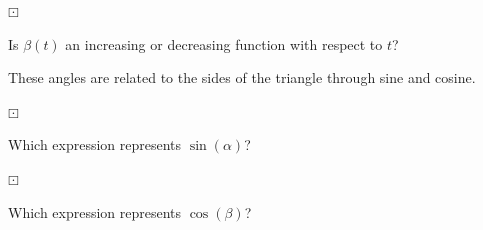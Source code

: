 \documentclass{ximera}
\begin{document}
\begin{question} $\boxdot$ 

Is $\beta(t)$ an increasing or decreasing function with respect to $t$?

\begin{multipleChoice}
\end{multipleChoice}

\end{question}







These angles are related to the sides of the triangle through sine and cosine.










\begin{question} $\boxdot$ 

Which expression represents $\sin(\alpha)$?

\begin{multipleChoice}
\end{multipleChoice}

\end{question}









\begin{question} $\boxdot$ 

Which expression represents $\cos(\beta)$?

\begin{multipleChoice}
\end{multipleChoice}

\end{question}
\end{document}
